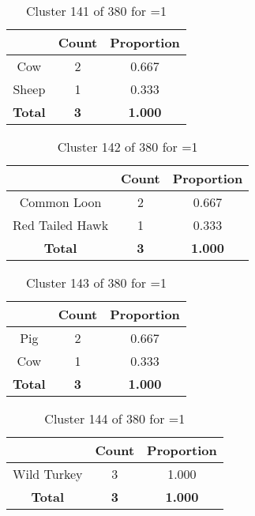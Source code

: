 \begin{table}[ht!]
\centering
\begin{tabular}{|c|c|c|}
\hline
\bf \Spec{} &\bf Count &\bf Proportion\\ \hline \hline
Cow & 2 & 0.667\\ \hline
Sheep & 1 & 0.333\\ \hline
\hline
\bf Total & \bf 3 & \bf 1.000\\ \hline
\end{tabular}
\label{tab:cluster:141:1}
\caption{Cluster 141 of 380 for \minneigh{}=1}
\end{table}

\begin{table}[ht!]
\centering
\begin{tabular}{|c|c|c|}
\hline
\bf \Spec{} &\bf Count &\bf Proportion\\ \hline \hline
Common Loon & 2 & 0.667\\ \hline
Red Tailed Hawk & 1 & 0.333\\ \hline
\hline
\bf Total & \bf 3 & \bf 1.000\\ \hline
\end{tabular}
\label{tab:cluster:142:1}
\caption{Cluster 142 of 380 for \minneigh{}=1}
\end{table}

\begin{table}[ht!]
\centering
\begin{tabular}{|c|c|c|}
\hline
\bf \Spec{} &\bf Count &\bf Proportion\\ \hline \hline
Pig & 2 & 0.667\\ \hline
Cow & 1 & 0.333\\ \hline
\hline
\bf Total & \bf 3 & \bf 1.000\\ \hline
\end{tabular}
\label{tab:cluster:143:1}
\caption{Cluster 143 of 380 for \minneigh{}=1}
\end{table}

\begin{table}[ht!]
\centering
\begin{tabular}{|c|c|c|}
\hline
\bf \Spec{} &\bf Count &\bf Proportion\\ \hline \hline
Wild Turkey & 3 & 1.000\\ \hline
\hline
\bf Total & \bf 3 & \bf 1.000\\ \hline
\end{tabular}
\label{tab:cluster:144:1}
\caption{Cluster 144 of 380 for \minneigh{}=1}
\end{table}

